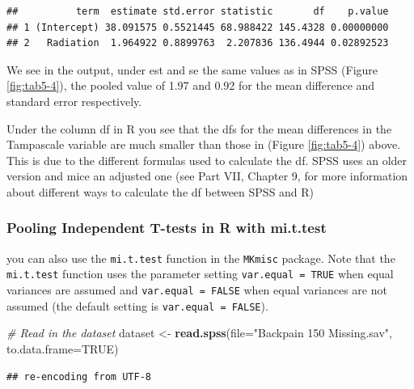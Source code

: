 \documentclass[
]{book}
\newenvironment{Shaded}{\begin{snugshade}}{\end{snugshade}}
\newcommand{\CommentTok}[1]{\textcolor[rgb]{0.56,0.35,0.01}{\textit{#1}}}
\newcommand{\DataTypeTok}[1]{\textcolor[rgb]{0.13,0.29,0.53}{#1}}
\newcommand{\KeywordTok}[1]{\textcolor[rgb]{0.13,0.29,0.53}{\textbf{#1}}}
\newcommand{\NormalTok}[1]{#1}
\newcommand{\OtherTok}[1]{\textcolor[rgb]{0.56,0.35,0.01}{#1}}
\newcommand{\StringTok}[1]{\textcolor[rgb]{0.31,0.60,0.02}{#1}}
\begin{document}
\begin{verbatim}
##          term  estimate std.error statistic       df    p.value
## 1 (Intercept) 38.091575 0.5521445 68.988422 145.4328 0.00000000
## 2   Radiation  1.964922 0.8899763  2.207836 136.4944 0.02892523
\end{verbatim}

We see in the output, under est and se the same values as in SPSS (Figure \ref{fig:tab5-4}), the pooled value of 1.97 and 0.92 for the mean difference and standard error respectively.

Under the column df in R you see that the dfs for the mean differences in the Tampascale variable are much smaller than those in (Figure \ref{fig:tab5-4}) above. This is due to the different formulas used to calculate the df. SPSS uses an older version and mice an adjusted one (see Part VII, Chapter 9, for more information about different ways to calculate the df between SPSS and R)

\hypertarget{pooling-independent-t-tests-in-r-with-mi.t.test}{%
\subsubsection{Pooling Independent T-tests in R with mi.t.test}\label{pooling-independent-t-tests-in-r-with-mi.t.test}}

you can also use the \texttt{mi.t.test} function in the \texttt{MKmisc} package. Note that the \texttt{mi.t.test} function uses the parameter setting \texttt{var.equal\ =\ TRUE} when equal variances are assumed and \texttt{var.equal\ =\ FALSE} when equal variances are not assumed (the default setting is \texttt{var.equal\ =\ FALSE}).

\begin{Shaded}
\begin{Highlighting}[]
\CommentTok{# Read in the dataset}
\NormalTok{dataset <-}\StringTok{ }\KeywordTok{read.spss}\NormalTok{(}\DataTypeTok{file=}\StringTok{"Backpain 150 Missing.sav"}\NormalTok{, }\DataTypeTok{to.data.frame=}\OtherTok{TRUE}\NormalTok{)}
\end{Highlighting}
\end{Shaded}

\begin{verbatim}
## re-encoding from UTF-8
\end{verbatim}
\end{document}
